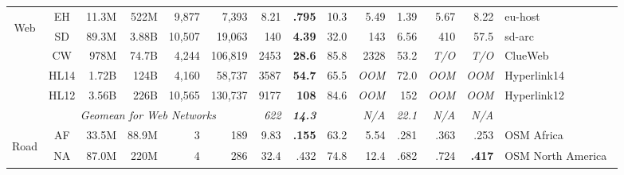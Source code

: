 \begin{table*}[!h]
\begin{tabular}{rccccc|rrr|r@{ }rrr|r}
\cmidrule{2-14}    \multicolumn{1}{c}{\multirow{5}[2]{*}{\begin{sideways}Web\end{sideways}}} & EH    & \multicolumn{1}{r}{11.3M} & \multicolumn{1}{r}{522M} & \multicolumn{1}{r}{9,877} & \multicolumn{1}{r|}{7,393} & 8.21  & \textbf{.795} & 10.3  & 5.49  & 1.39  & 5.67  & 8.22  & \multicolumn{1}{l}{eu-host~\cite{webgraph}} \\
          & SD    & \multicolumn{1}{r}{89.3M} & \multicolumn{1}{r}{3.88B} & \multicolumn{1}{r}{10,507} & \multicolumn{1}{r|}{19,063} & 140   & \textbf{4.39} & 32.0  & 143   & 6.56  & 410   & 57.5  & \multicolumn{1}{l}{sd-arc~\cite{webgraph}} \\
          & CW    & \multicolumn{1}{r}{978M} & \multicolumn{1}{r}{74.7B} & \multicolumn{1}{r}{4,244} & \multicolumn{1}{r|}{106,819} & 2453  & \textbf{28.6} & 85.8  & 2328 & 53.2  & \textit{T/O} & \textit{T/O} & \multicolumn{1}{l}{ClueWeb~\cite{webgraph}} \\
          & HL14  & \multicolumn{1}{r}{1.72B} & \multicolumn{1}{r}{124B} & \multicolumn{1}{r}{4,160} & \multicolumn{1}{r|}{58,737} & 3587  & \textbf{54.7} & 65.5  & \textit{OOM} & 72.0  & \textit{OOM} & \textit{OOM} & \multicolumn{1}{l}{Hyperlink14~\cite{webgraph}} \\
          & HL12  & \multicolumn{1}{r}{3.56B} & \multicolumn{1}{r}{226B} & \multicolumn{1}{r}{10,565} & \multicolumn{1}{r|}{130,737} & 9177  & \textbf{108} & 84.6  & \textit{OOM} & 152   & \textit{OOM} & \textit{OOM} & \multicolumn{1}{l}{Hyperlink12~\cite{webgraph}} \\
\cmidrule{2-14}          & \multicolumn{5}{c|}{\textit{Geomean for Web Networks}} & \textit{622} & \textit{\textbf{14.3}} &       & \textit{N/A} & \textit{22.1} & \textit{N/A} & \textit{N/A} &  \\
\cmidrule{2-14}    \multicolumn{1}{c}{\multirow{4}[2]{*}{\begin{sideways}Road\end{sideways}}} & AF    & \multicolumn{1}{r}{33.5M} & \multicolumn{1}{r}{88.9M} & \multicolumn{1}{r}{3} & \multicolumn{1}{r|}{189} & 9.83  & \textbf{.155} & 63.2  & 5.54  & .281  & .363  & .253  & \multicolumn{1}{l}{OSM Africa~\cite{roadgraph}} \\
          & NA    & \multicolumn{1}{r}{87.0M} & \multicolumn{1}{r}{220M} & \multicolumn{1}{r}{4} & \multicolumn{1}{r|}{286} & 32.4  & .432  & 74.8  & 12.4  & .682  & .724  & \textbf{.417} & \multicolumn{1}{l}{OSM North America~\cite{roadgraph}} \\

\end{tabular}
\end{table*}
